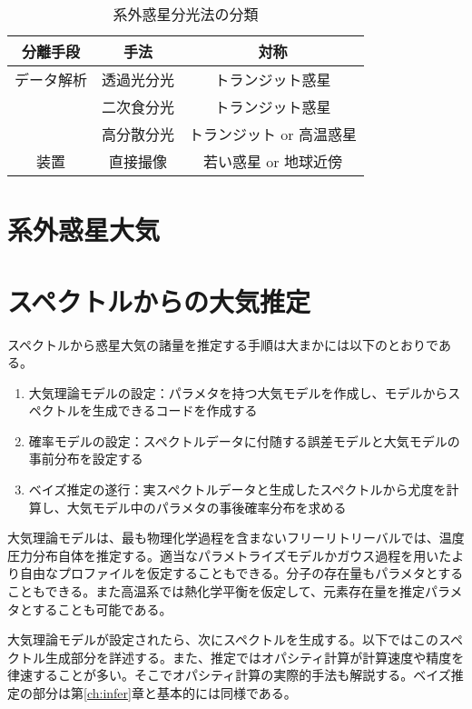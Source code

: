 \documentclass[xelatex,a4paper, twocolumn]{bxjsreport}
\begin{document}
\begin{table}[htbp]
\footnotesize
  \centering
  \caption{系外惑星分光法の分類}
  \label{tab:light_sep}
  \begin{tabular}{ccc}
    \hline
    分離手段 & 手法 & 対称 \\
    \hline
    データ解析 & 透過光分光 & トランジット惑星 \\
     & 二次食分光 & トランジット惑星 \\
     & 高分散分光 & トランジット or 高温惑星 \\
    \hline
    装置 & 直接撮像 & 若い惑星 or 地球近傍\\
    \hline
  \end{tabular}
\end{table}








\chapter{系外惑星大気}




\chapter{スペクトルからの大気推定}

スペクトルから惑星大気の諸量を推定する手順は大まかには以下のとおりである。
\begin{enumerate}
    \item 大気理論モデルの設定：パラメタを持つ大気モデルを作成し、モデルからスペクトルを生成できるコードを作成する
    \item 確率モデルの設定：スペクトルデータに付随する誤差モデルと大気モデルの事前分布を設定する 
    \item ベイズ推定の遂行：実スペクトルデータと生成したスペクトルから尤度を計算し、大気モデル中のパラメタの事後確率分布を求める
\end{enumerate}

大気理論モデルは、最も物理化学過程を含まないフリーリトリーバルでは、温度圧力分布自体を推定する。適当なパラメトライズモデルかガウス過程を用いたより自由なプロファイルを仮定することもできる。分子の存在量もパラメタとすることもできる。また高温系では熱化学平衡を仮定して、元素存在量を推定パラメタとすることも可能である。

大気理論モデルが設定されたら、次にスペクトルを生成する。以下ではこのスペクトル生成部分を詳述する。また、推定ではオパシティ計算が計算速度や精度を律速することが多い。そこでオパシティ計算の実際的手法も解説する。ベイズ推定の部分は第\ref{ch:infer}章と基本的には同様である。
\end{document}

